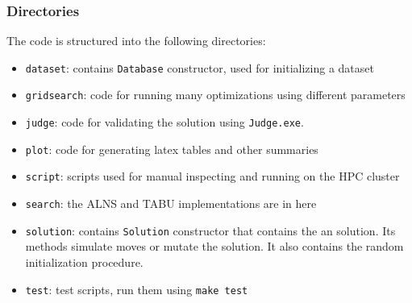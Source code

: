 \subsubsection*{Directories}

The code is structured into the following directories:

\begin{itemize}[noitemsep]
\item \texttt{dataset}: contains \texttt{Database} constructor, used for initializing a dataset
\item \texttt{gridsearch}: code for running many optimizations using different parameters
\item \texttt{judge}: code for validating the solution using \texttt{Judge.exe}.
\item \texttt{plot}: code for generating latex tables and other summaries
\item \texttt{script}: scripts used for manual inspecting and running on the HPC cluster
\item \texttt{search}: the ALNS and TABU implementations are in here
\item \texttt{solution}: contains \texttt{Solution} constructor that contains the an solution. Its
 methods simulate moves or mutate the solution. It also contains the random
 initialization procedure.
\item \texttt{test}: test scripts, run them using \texttt{make test}
\end{itemize}
